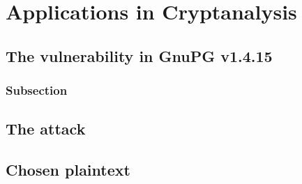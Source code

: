\chapter{Applications in Cryptanalysis}
\label{chp:application_in_cryptanalysis} 

\section{The vulnerability in GnuPG v1.4.15}\label{sec:vulnerability_gnupg}

\subsection{Subsection}\label{sec:first_ssection}


\section{The attack}\label{sec:attack}


\section{Chosen plaintext}\label{sec:chosen_plaintext}